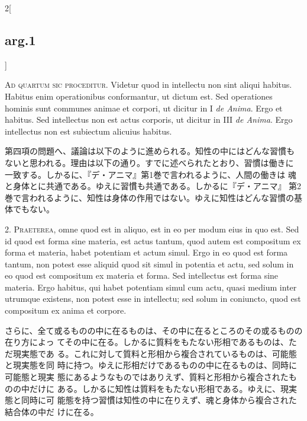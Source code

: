 \documentclass[paper=a4paper,fontsize=10pt,jafontsize=9pt,titlepage]{jlreq}
\begin{document}
\begin{paracol}{2}[\subsection{arg.1}]

{\scshape Ad quartum sic proceditur}. Videtur quod in intellectu non sint aliqui
 habitus. Habitus enim operationibus conformantur, ut dictum est. Sed
 operationes hominis sunt communes animae et corpori, ut dicitur in I
 {\itshape de Anima}. Ergo et habitus. Sed intellectus non est actus corporis, ut
 dicitur in III {\itshape de Anima}. Ergo intellectus non est subiectum alicuius
 habitus.

\switchcolumn

第四項の問題へ、議論は以下のように進められる。知性の中にはどんな習慣も
ないと思われる。理由は以下の通り。すでに述べられたとおり、習慣は働きに
一致する。しかるに、『デ・アニマ』第1巻で言われるように、人間の働きは
魂と身体とに共通である。ゆえに習慣も共通である。しかるに『デ・アニマ』
第2巻で言われるように、知性は身体の作用ではない。ゆえに知性はどんな習慣の基体でもない。


2. {\scshape Praeterea}, omne quod est in aliquo, est in eo per modum eius in quo
 est. Sed id quod est forma sine materia, est actus tantum, quod autem
 est compositum ex forma et materia, habet potentiam et actum
 simul. Ergo in eo quod est forma tantum, non potest esse aliquid quod
 sit simul in potentia et actu, sed solum in eo quod est compositum ex
 materia et forma. Sed intellectus est forma sine materia. Ergo
 habitus, qui habet potentiam simul cum actu, quasi medium inter
 utrumque existens, non potest esse in intellectu; sed solum in
 coniuncto, quod est compositum ex anima et corpore.

\switchcolumn

さらに、全て或るものの中に在るものは、その中に在るところのその或るものの在り方によっ
てその中に在る。しかるに質料をもたない形相であるものは、ただ現実態であ
る。これに対して質料と形相から複合されているものは、可能態と現実態を同
時に持つ。ゆえに形相だけであるものの中に在るものは、同時に可能態と現実
態にあるようなものではありえず、質料と形相から複合されたものの中だけに
ある。しかるに知性は質料をもたない形相である。ゆえに、現実態と同時に可
能態を持つ習慣は知性の中に在りえず、魂と身体から複合された結合体の中だ
けに在る。


\end{paracol}
\end{document}
